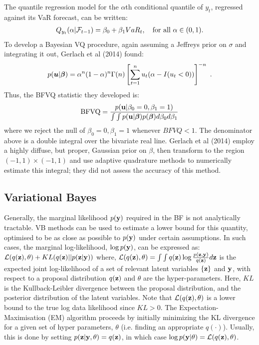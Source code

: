 \documentclass[12pt,epsf]{article}
\newcommand{\utwi}[1]{\mbox{\boldmath $ #1$}}
\newcommand{\calF}{{\cal F}}
\begin{document}
The quantile regression model for the $\alpha$th conditional quantile of $y_t$, regressed against its VaR forecast, can be written:
\begin{eqnarray*}
Q_{y_t } (\alpha |\calF_{t-1}  ) = \beta_0  + \beta_1 VaR_t, \quad{\textrm{for all }}\alpha  \in {\rm{(0,1)}}.
\end{eqnarray*}
To develop a Bayesian VQ procedure, again assuming a Jeffreys prior on $\sigma$ and integrating it out, Gerlach et al (2014) found:
\begin{eqnarray*}
p(\utwi{u}|\utwi{\beta}) = \alpha^n(1-\alpha)^n \Gamma(n) \left[\sum^{n}_{t=1} u_{t}(\alpha-I(u_t<0)) \right]^{-n} \,\, .
\end{eqnarray*}
Thus, the BFVQ statistic they developed is:
$$
\mbox{BFVQ} = \frac{ p({\bf u}|\beta_0=0, \beta_1=1)}{ \int \int p({\bf u}|\utwi{\beta}) p(\utwi{\beta}) d \beta_0 d \beta_1 }
$$
where we reject the null of $\beta_0=0, \beta_1=1$ whenever $BFVQ<1$. The denominator above is a double integral over the
bivariate real line. Gerlach et al (2014) employ a highly diffuse, but proper, Gaussian prior on $\beta$, then transform to
the region $(-1,1)\times(-1,1)$ and use adaptive quadrature methods to numerically estimate this integral; they did not
assess the accuracy of this method.

\subsection{Variational Bayes}
\label{sec:VB}
Generally, the marginal likelihood $p(\mathbf{y})$ required in the BF is not analytically tractable. VB methods can be used to estimate a
lower bound for this quantity, optimised to be as close as possible to $p(\mathbf{y})$ under certain assumptions. In such cases, the
marginal log-likelihood, $\log p(\mathbf{y})$, can be expressed as:
$\mathcal{L}(q(\mathbf{z}),\theta)+KL(q(\mathbf{z})||p(\mathbf{z}|\mathbf{y}))$ where, $\mathcal{L}(q(\mathbf{z}),\theta)=\int\int q(\mathbf{z})\log\frac{p(\mathbf{z},\mathbf{y})}{q(\mathbf{z})}d\mathbf{z}$ is the expected joint log-likelihood of a set of relevant latent variables $\{\mathbf{z}\}$ and $\mathbf{y}$, with respect to a proposal distribution $q(\mathbf{z})$ and $\theta$ are the hyper-parameters. 
Here, $KL$ is the Kullback-Leibler divergence between the proposal distribution, and the posterior distribution of the latent variables. Note that $\mathcal{L}(q(\mathbf{z}),\theta)$ is a lower bound to the true log data likelihood since $KL>0$. The Expectation-Maximisation (EM) algorithm proceeds by initially minimizing the KL divergence for a given set of hyper parameters, $\theta$ (i.e. finding an appropriate $q(\cdot)$). Usually, this is done by
setting $p(\mathbf{z}|\mathbf{y},\theta)=q(\mathbf{z})$, in which case $\log p(\mathbf{y}|\theta)=\mathcal{L}(q(\mathbf{z}),\theta)$.
\end{document}
